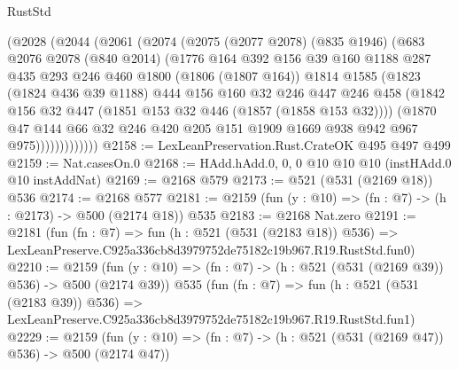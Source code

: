 \begin{lexlean}{RustStd}
\begin{coremodule}
            (@2028
              (@2044
                (@2061
                  (@2074
                    (@2075
                      (@2077 @2078)
                      (@835 @1946)
                      (@683
                        @2076
                        @2078
                        (@840 @2014)
                        (@1776
                          @164
                          @392
                          @156
                          @39
                          @160
                          @1188
                          @287
                          @435
                          @293
                          @246
                          @460
                          @1800
                          (@1806 (@1807 @164))
                          @1814
                          @1585
                          (@1823
                            (@1824 @436 @39 @1188)
                            @444
                            @156
                            @160
                            @32
                            @246
                            @447
                            @246
                            @458
                            (@1842 @156 @32 @447 (@1851 @153 @32 @446 (@1857 (@1858 @153 @32))))
                            (@1870
                              @47
                              @144
                              @66
                              @32
                              @246
                              @420
                              @205
                              @151
                              @1909
                              @1669
                              @938
                              @942
                              @967
                              @975)))))))))))))
@2158 := LexLeanPreservation.Rust.CrateOK @495 @497 @499
@2159 := Nat.casesOn.{0}
@2168 := HAdd.hAdd.{0, 0, 0} @10 @10 @10 (instHAdd.{0} @10 instAddNat)
@2169 := @2168 @579
@2173 := @521 (@531 (@2169 @18)) @536
@2174 := @2168 @577
@2181 := @2159 (fun (y : @10) => (fn : @7) -> (h : @2173) -> @500 (@2174 @18)) @535
@2183 := @2168 Nat.zero
@2191 := @2181
    (fun (fn : @7) =>
    fun (h : @521 (@531 (@2183 @18)) @536) =>
    LexLeanPreserve.C925a336cb8d3979752de75182c19b967.R19.RustStd.fun0)
@2210 := @2159
    (fun (y : @10) => (fn : @7) -> (h : @521 (@531 (@2169 @39)) @536) -> @500 (@2174 @39))
    @535
    (fun (fn : @7) =>
    fun (h : @521 (@531 (@2183 @39)) @536) =>
    LexLeanPreserve.C925a336cb8d3979752de75182c19b967.R19.RustStd.fun1)
@2229 := @2159
    (fun (y : @10) => (fn : @7) -> (h : @521 (@531 (@2169 @47)) @536) -> @500 (@2174 @47))

\end{coremodule}
\end{lexlean}

